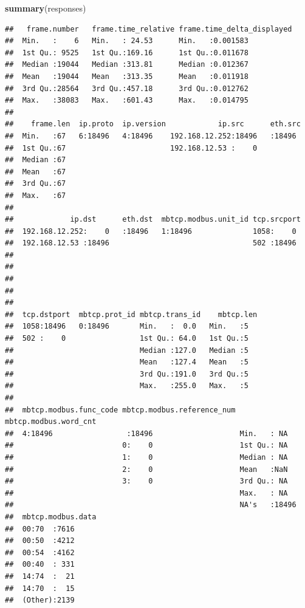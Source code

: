 \documentclass[]{article}
\newenvironment{Shaded}{\begin{snugshade}}{\end{snugshade}}
\newcommand{\KeywordTok}[1]{\textcolor[rgb]{0.13,0.29,0.53}{\textbf{{#1}}}}
\newcommand{\NormalTok}[1]{{#1}}
\begin{document}
\begin{Shaded}
\begin{Highlighting}[]
\KeywordTok{summary}\NormalTok{(responses)}
\end{Highlighting}
\end{Shaded}

\begin{verbatim}
##   frame.number   frame.time_relative frame.time_delta_displayed
##  Min.   :    6   Min.   : 24.53      Min.   :0.001583          
##  1st Qu.: 9525   1st Qu.:169.16      1st Qu.:0.011678          
##  Median :19044   Median :313.81      Median :0.012367          
##  Mean   :19044   Mean   :313.35      Mean   :0.011918          
##  3rd Qu.:28564   3rd Qu.:457.18      3rd Qu.:0.012762          
##  Max.   :38083   Max.   :601.43      Max.   :0.014795          
##                                                                
##    frame.len  ip.proto  ip.version            ip.src      eth.src 
##  Min.   :67   6:18496   4:18496    192.168.12.252:18496   :18496  
##  1st Qu.:67                        192.168.12.53 :    0           
##  Median :67                                                       
##  Mean   :67                                                       
##  3rd Qu.:67                                                       
##  Max.   :67                                                       
##                                                                   
##             ip.dst      eth.dst  mbtcp.modbus.unit_id tcp.srcport 
##  192.168.12.252:    0   :18496   1:18496              1058:    0  
##  192.168.12.53 :18496                                 502 :18496  
##                                                                   
##                                                                   
##                                                                   
##                                                                   
##                                                                   
##  tcp.dstport  mbtcp.prot_id mbtcp.trans_id    mbtcp.len
##  1058:18496   0:18496       Min.   :  0.0   Min.   :5  
##  502 :    0                 1st Qu.: 64.0   1st Qu.:5  
##                             Median :127.0   Median :5  
##                             Mean   :127.4   Mean   :5  
##                             3rd Qu.:191.0   3rd Qu.:5  
##                             Max.   :255.0   Max.   :5  
##                                                        
##  mbtcp.modbus.func_code mbtcp.modbus.reference_num mbtcp.modbus.word_cnt
##  4:18496                 :18496                    Min.   : NA          
##                         0:    0                    1st Qu.: NA          
##                         1:    0                    Median : NA          
##                         2:    0                    Mean   :NaN          
##                         3:    0                    3rd Qu.: NA          
##                                                    Max.   : NA          
##                                                    NA's   :18496        
##  mbtcp.modbus.data
##  00:70  :7616     
##  00:50  :4212     
##  00:54  :4162     
##  00:40  : 331     
##  14:74  :  21     
##  14:70  :  15     
##  (Other):2139
\end{verbatim}
\end{document}

